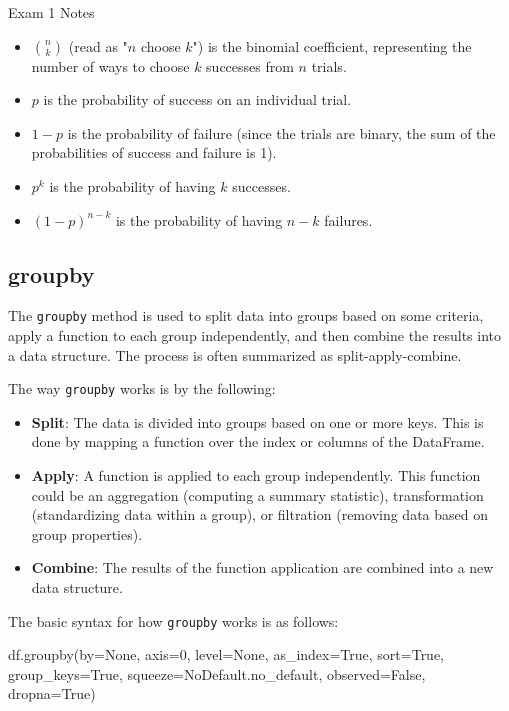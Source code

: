 \begin{examnotes}{Exam 1 Notes}
\begin{itemize}
\begin{itemize}
\begin{itemize}
                \item $\binom{n}{k}$ (read as "$n$ choose $k$") is the binomial coefficient, representing the number of ways to choose $k$ successes from $n$ trials.
                \item $p$ is the probability of success on an individual trial.
                \item $1 - p$ is the probability of failure (since the trials are binary, the sum of the probabilities of success and failure is 1).
                \item $p^{k}$ is the probability of having $k$ successes.
                \item $(1 - p)^{n - k}$ is the probability of having $n - k$ failures.
            \end{itemize}
        \end{itemize}
    \end{itemize}

    \subsection*{groupby}

    The \texttt{groupby} method is used to split data into groups based on some criteria, apply a function to each group independently, and then combine the results into a data structure. The process 
    is often summarized as split-apply-combine.

    The way \texttt{groupby} works is by the following:

    \begin{itemize}
        \item \textbf{Split}: The data is divided into groups based on one or more keys. This is done by mapping a function over the index or columns of the DataFrame.
        \item \textbf{Apply}: A function is applied to each group independently. This function could be an aggregation (computing a summary statistic), transformation (standardizing data within a group), 
        or filtration (removing data based on group properties).
        \item \textbf{Combine}: The results of the function application are combined into a new data structure.
    \end{itemize}

    The basic syntax for how \texttt{groupby} works is as follows:

    \begin{code}[Python]
    df.groupby(by=None, axis=0, level=None, as_index=True, sort=True, group_keys=True, squeeze=NoDefault.no_default, observed=False, dropna=True)
    \end{code}


\end{examnotes}
